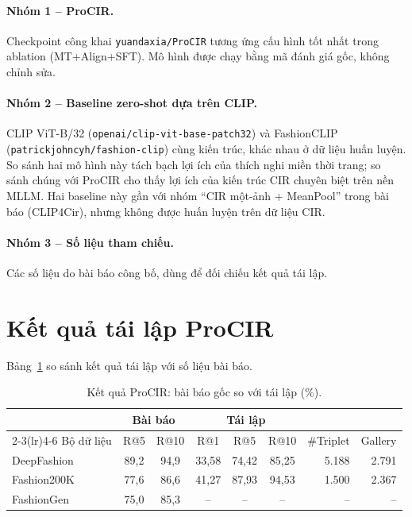\paragraph{Nhóm 1 -- ProCIR.} Checkpoint công khai \texttt{yuandaxia/ProCIR} tương ứng cấu hình tốt nhất trong ablation (MT+Align+SFT). Mô hình được chạy bằng mã đánh giá gốc, không chỉnh sửa.

\paragraph{Nhóm 2 -- Baseline zero-shot dựa trên CLIP.} CLIP ViT-B/32 (\texttt{openai/clip-vit-base-patch32}) và FashionCLIP (\texttt{patrickjohncyh/fashion-clip}) cùng kiến trúc, khác nhau ở dữ liệu huấn luyện. So sánh hai mô hình này tách bạch lợi ích của thích nghi miền thời trang; so sánh chúng với ProCIR cho thấy lợi ích của kiến trúc CIR chuyên biệt trên nền MLLM. Hai baseline này gần với nhóm ``CIR một-ảnh + MeanPool'' trong bài báo (CLIP4Cir), nhưng không được huấn luyện trên dữ liệu CIR.

\paragraph{Nhóm 3 -- Số liệu tham chiếu.} Các số liệu do bài báo công bố, dùng để đối chiếu kết quả tái lập.

\section{Kết quả tái lập ProCIR}\label{sec:repro-results}

Bảng~\ref{tab:repro} so sánh kết quả tái lập với số liệu bài báo.

\begin{table}[h]
\centering
\caption{Kết quả ProCIR: bài báo gốc so với tái lập (\%).}
\label{tab:repro}
\begin{tabular}{lcccccrr}
\toprule
& \multicolumn{2}{c}{Bài báo} & \multicolumn{3}{c}{Tái lập} & & \\
\cmidrule(lr){2-3}\cmidrule(lr){4-6}
Bộ dữ liệu & R@5 & R@10 & R@1 & R@5 & R@10 & \#Triplet & Gallery \\
\midrule
DeepFashion & 89,2 & 94,9 & 33,58 & 74,42 & 85,25 & 5.188 & 2.791 \\
Fashion200K & 77,6 & 86,6 & 41,27 & 87,93 & 94,53 & 1.500 & 2.367 \\
FashionGen  & 75,0 & 85,3 & -- & -- & -- & -- & -- \\
\bottomrule
\end{tabular}
\end{table}

